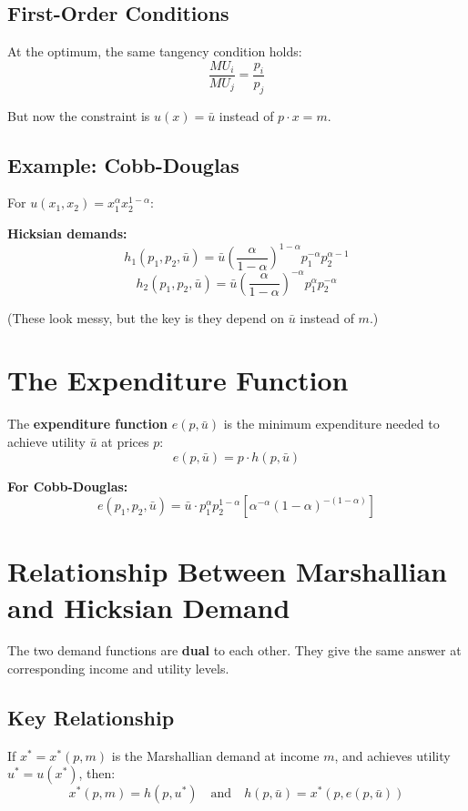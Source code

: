 \documentclass[11pt]{article}
\begin{document}
\subsection{First-Order Conditions}

At the optimum, the same tangency condition holds:
\[
\frac{MU_i}{MU_j} = \frac{p_i}{p_j}
\]

But now the constraint is $u(x) = \bar{u}$ instead of $p \cdot x = m$.

\subsection{Example: Cobb-Douglas}

For $u(x_1, x_2) = x_1^\alpha x_2^{1-\alpha}$:

\textbf{Hicksian demands:}
\[
h_1(p_1, p_2, \bar{u}) = \bar{u} \left(\frac{\alpha}{1-\alpha}\right)^{1-\alpha} p_1^{-\alpha} p_2^{\alpha-1}
\]
\[
h_2(p_1, p_2, \bar{u}) = \bar{u} \left(\frac{\alpha}{1-\alpha}\right)^{-\alpha} p_1^{\alpha} p_2^{-\alpha}
\]

(These look messy, but the key is they depend on $\bar{u}$ instead of $m$.)

\section{The Expenditure Function}

The \textbf{expenditure function} $e(p, \bar{u})$ is the minimum expenditure needed to achieve utility $\bar{u}$ at prices $p$:
\[
e(p, \bar{u}) = p \cdot h(p, \bar{u})
\]

\textbf{For Cobb-Douglas:}
\[
e(p_1, p_2, \bar{u}) = \bar{u} \cdot p_1^\alpha p_2^{1-\alpha} \left[\alpha^{-\alpha}(1-\alpha)^{-(1-\alpha)}\right]
\]

\section{Relationship Between Marshallian and Hicksian Demand}

The two demand functions are \textbf{dual} to each other. They give the same answer at corresponding income and utility levels.

\subsection{Key Relationship}

If $x^* = x^*(p, m)$ is the Marshallian demand at income $m$, and achieves utility $u^* = u(x^*)$, then:
\[
\boxed{x^*(p, m) = h(p, u^*) \quad \text{and} \quad h(p, \bar{u}) = x^*(p, e(p, \bar{u}))}
\]
\end{document}
